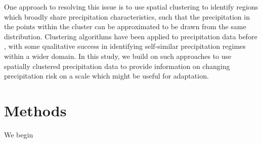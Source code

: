 \documentclass{article}
\begin{document}
One approach to resolving this issue is to use spatial clustering to identify regions which broadly share precipitation characteristics, such that the precipitation in the points within the cluster can be approximated to be drawn from the same distribution. Clustering algorithms have been applied to precipitation data before  \cite{ong1995application,hargrove1998new,yavuz2012spatial}, with some qualitative success in identifying self-similar precipitation regimes within a wider domain.  In this study, we build on such approaches to use spatially clustered precipitation data to provide information on changing precipitation risk on a scale which might be useful for adaptation.

\section{Methods}

We begin 




\end{document}
